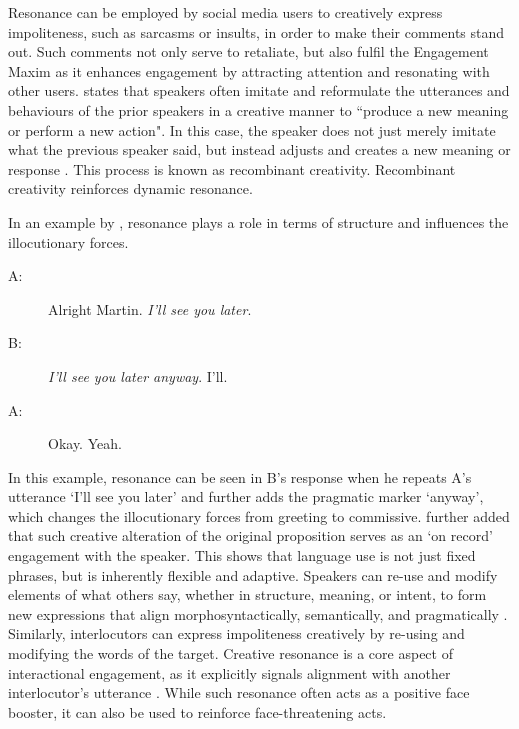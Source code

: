\documentclass[english]{textolivre}
\begin{document}
Resonance can be employed by social media users to creatively express impoliteness, such as sarcasms or insults, in order to make their comments stand out. Such comments not only serve to retaliate, but also fulfil the Engagement Maxim as it enhances engagement by attracting attention and resonating with other users. \textcite[p. 247]{tantucci2023} states that speakers often imitate and reformulate the utterances and behaviours of the prior speakers in a creative manner to ``produce a new meaning or perform a new action". In this case, the speaker does not just merely imitate what the previous speaker said, but instead adjusts and creates a new meaning or response \cite{tantucci2023}. This process is known as recombinant creativity. Recombinant creativity reinforces dynamic resonance. 

In an example by \textcite[p. 10]{tantucci2018}, resonance plays a role in terms of structure and influences the illocutionary forces.
\begin{description}
\item[A:] Alright Martin. \emph{I’ll see you later}.
\item[B:] \emph{I’ll see you later anyway}. I’ll.
\item[A:] Okay. Yeah.
\end{description}


In this example, resonance can be seen in B’s response when he repeats A’s utterance ‘I’ll see you later’ and further adds the pragmatic marker ‘anyway’, which changes the illocutionary forces from greeting to commissive. \textcite{tantucci2023} further added that such creative alteration of the original proposition serves as an ‘on record’ engagement with the speaker. This shows that language use is not just fixed phrases, but is inherently flexible and adaptive. Speakers can re-use and modify elements of what others say, whether in structure, meaning, or intent, to form new expressions that align morphosyntactically, semantically, and pragmatically \cite{dubois2014}. Similarly, interlocutors can express impoliteness creatively by re-using and modifying the words of the target. Creative resonance is a core aspect of interactional engagement, as it explicitly signals alignment with another interlocutor’s utterance \cite{tantucci2024}. While such resonance often acts as a positive face booster, it can also be used to reinforce face-threatening acts.
\end{document}
